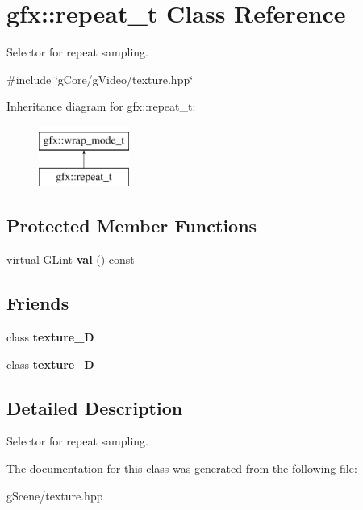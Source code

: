 \hypertarget{classgfx_1_1repeat__t}{\section{gfx\-:\-:repeat\-\_\-t Class Reference}
\label{classgfx_1_1repeat__t}
}


Selector for repeat sampling.  




{\ttfamily \#include \char`\"{}g\-Core/g\-Video/texture.\-hpp\char`\"{}}

Inheritance diagram for gfx\-:\-:repeat\-\_\-t\-:\begin{figure}[H]
\begin{center}
\leavevmode
\includegraphics[height=2.000000cm]{classgfx_1_1repeat__t}
\end{center}
\end{figure}
\subsection*{Protected Member Functions}
\begin{DoxyCompactItemize}
\item 
\hypertarget{classgfx_1_1repeat__t_aba33cb8b5d640678fb7b344ad3046890}{virtual G\-Lint {\bfseries val} () const }\label{classgfx_1_1repeat__t_aba33cb8b5d640678fb7b344ad3046890}

\end{DoxyCompactItemize}
\subsection*{Friends}
\begin{DoxyCompactItemize}
\item 
\hypertarget{classgfx_1_1repeat__t_a2039d67f6166ccf823c78e3476aad9aa}{class {\bfseries texture\-\_\-D}}\label{classgfx_1_1repeat__t_a2039d67f6166ccf823c78e3476aad9aa}

\item 
\hypertarget{classgfx_1_1repeat__t_a22ad86ef46c3b17357a0cd59e50bc7dd}{class {\bfseries texture\-\_\-D}}\label{classgfx_1_1repeat__t_a22ad86ef46c3b17357a0cd59e50bc7dd}

\end{DoxyCompactItemize}


\subsection{Detailed Description}
Selector for repeat sampling. 

The documentation for this class was generated from the following file\-:\begin{DoxyCompactItemize}
\item 
g\-Scene/texture.\-hpp\end{DoxyCompactItemize}
